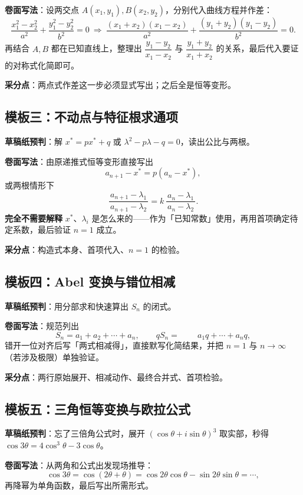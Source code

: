 \textbf{卷面写法}：设两交点 $A(x_1,y_1),B(x_2,y_2)$，分别代入曲线方程并作差：
\[
  \frac{x_1^2-x_2^2}{a^2}+\frac{y_1^2-y_2^2}{b^2}=0
  \ \Longrightarrow\
  \frac{(x_1+x_2)(x_1-x_2)}{a^2}+\frac{(y_1+y_2)(y_1-y_2)}{b^2}=0 .
\]
再结合 $A,B$ 都在已知直线上，整理出 $\dfrac{y_1-y_2}{x_1-x_2}$ 与 $\dfrac{y_1+y_2}{x_1+x_2}$ 的关系，最后代入要证的对称式化简即可。

\textbf{采分点}：两点式作差这一步必须显式写出；之后全是恒等变形。

\subsection*{模板三：不动点与特征根求通项}

\textbf{草稿纸预判}：解 $x^*=px^*+q$ 或 $\lambda^2-p\lambda-q=0$，读出公比与两根。

\textbf{卷面写法}：由原递推式恒等变形直接写出
\[
  a_{n+1}-x^*=p(a_n-x^*) ,
\]
或两根情形下
\[
  \frac{a_{n+1}-\lambda_1}{\,a_{n+1}-\lambda_2\,}=k\,\frac{a_n-\lambda_1}{\,a_n-\lambda_2\,} .
\]
\textbf{完全不需要解释} $x^*$、$\lambda_i$ 是怎么来的——作为「已知常数」使用，再用首项确定待定系数，最后验证 $n=1$ 成立。

\textbf{采分点}：构造式本身、首项代入、$n=1$ 的检验。

\subsection*{模板四：Abel 变换与错位相减}

\textbf{草稿纸预判}：用分部求和快速算出 $S_n$ 的闭式。

\textbf{卷面写法}：规范列出
\[
  S_n=a_1+a_2+\cdots+a_n,\qquad
  qS_n=\phantom{a_1+{}}a_1q+\cdots+a_nq ,
\]
错开一位对齐后写「两式相减得」，直接默写化简结果，并把 $n=1$ 与 $n\to\infty$（若涉及极限）单独验证。

\textbf{采分点}：两行原始展开、相减动作、最终合并式、首项检验。

\subsection*{模板五：三角恒等变换与欧拉公式}

\textbf{草稿纸预判}：忘了三倍角公式时，展开 $(\cos\theta+i\sin\theta)^3$ 取实部，秒得 $\cos3\theta=4\cos^3\theta-3\cos\theta$。

\textbf{卷面写法}：从两角和公式出发现场推导：
\[
  \cos3\theta=\cos(2\theta+\theta)=\cos2\theta\cos\theta-\sin2\theta\sin\theta=\cdots,
\]
再降幂为单角函数，最后写出所需形式。

